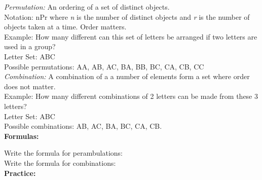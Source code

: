 \documentclass[12pt]{article}
\begin{document}
\textit{Permutation:}   An ordering of a set of distinct objects.  \\  [12pt]
Notation: nPr where \textit{n} is the number of distinct objects and \textit{r} is the number of objects taken at a time.  Order matters.\\[12pt]
Example: How many different can this set of letters be arranged if two letters are used in a group?\\[12pt]
Letter Set: ABC\\[12pt]
Possible permutations: AA, AB,  AC, BA,  BB,  BC, CA, CB,  CC\\ [12pt]

\textit{Combination:}  A combination of a a number of elements form a set where order does not matter. \\ [12pt]
Example: How many different combinations of 2 letters can be made from these 3 letters?\\ [12pt]
Letter Set: ABC\\ [12pt]
Possible combinations: AB,  AC,  BA, BC, CA, CB. \\ [12pt]

\textbf{Formulas:}

Write the formula for perambulations: \\

Write the formula for combinations: \\

\textbf{Practice:}
\end{document}
